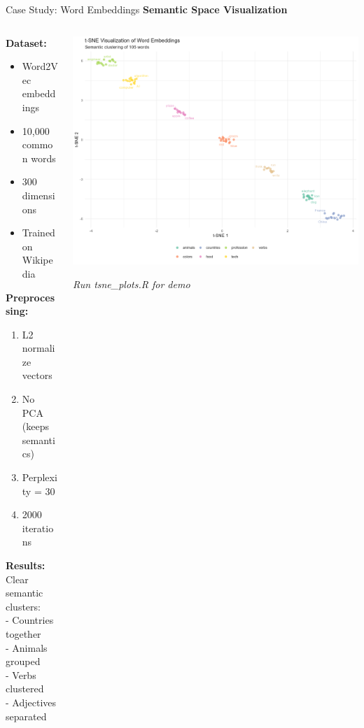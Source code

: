 \documentclass[10pt]{beamer}
\newcommand{\emphtext}[1]{\textcolor{upcblue}{\textbf{#1}}}
\begin{document}
\begin{frame}{Case Study: Word Embeddings}
\emphtext{Semantic Space Visualization}

\vspace{0.3cm}
\begin{columns}[T]
\begin{column}{0.48\textwidth}
\textbf{Dataset:}
\begin{itemize}
\footnotesize
\item Word2Vec embeddings
\item 10,000 common words
\item 300 dimensions
\item Trained on Wikipedia
\end{itemize}

\vspace{0.2cm}
\textbf{Preprocessing:}
\begin{enumerate}
\footnotesize
\item L2 normalize vectors
\item No PCA (keeps semantics)
\item Perplexity = 30
\item 2000 iterations
\end{enumerate}

\vspace{0.2cm}
\textbf{Results:}\\
\footnotesize
Clear semantic clusters:\\
- Countries together\\
- Animals grouped\\
- Verbs clustered\\
- Adjectives separated
\end{column}

\begin{column}{0.48\textwidth}
\begin{center}
\includegraphics[width=\linewidth]{./Figures/word2vec_tsne.png}
\end{center}
\footnotesize\textit{Run tsne\_plots.R for demo}


\end{column}
\end{columns}
\end{frame}
\end{document}
